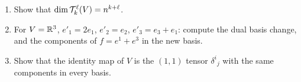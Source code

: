 \begin{exercises}
\begin{enumerate}[nosep]
\item Show that $\dim\mathcal{T}^{\ell}_{k}(V)=n^{k+\ell}$.
\item For $V=\mathbb{R}^3$, $e'_1=2e_1$, $e'_2=e_2$, $e'_3=e_3+e_1$: compute the dual basis change, and the components of $f=e^{1}+e^{3}$ in the new basis.
\item Show that the identity map of $V$ is the $(1,1)$ tensor $\delta^i{}_j$ with the same components in every basis.
\end{enumerate}
\end{exercises}
